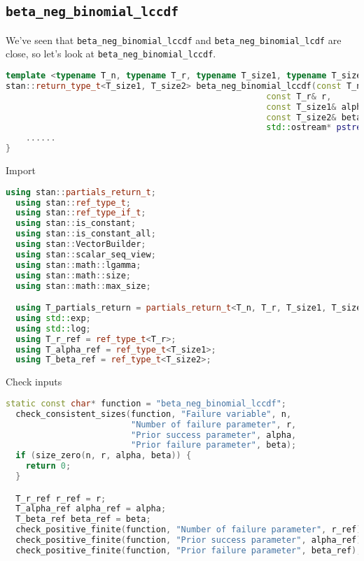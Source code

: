 \documentclass[11pt]{article}
\begin{document}
\cprotect\subsection{\verb|beta_neg_binomial_lccdf|}

We've seen that \verb|beta_neg_binomial_lccdf| and \verb|beta_neg_binomial_lcdf| are close, so let's look at \verb|beta_neg_binomial_lccdf|.

\begin{lstlisting}[language=c++, style=lgeneral]
template <typename T_n, typename T_r, typename T_size1, typename T_size2>
stan::return_type_t<T_size1, T_size2> beta_neg_binomial_lccdf(const T_n& n, 
                                                    const T_r& r,
                                                    const T_size1& alpha,
                                                    const T_size2& beta,
                                                    std::ostream* pstream__) {
	......
}
\end{lstlisting}

Import
\begin{lstlisting}[language=c++, style=lgeneral]
  using stan::partials_return_t;
  using stan::ref_type_t;
  using stan::ref_type_if_t;
  using stan::is_constant;
  using stan::is_constant_all;
  using stan::VectorBuilder;
  using stan::scalar_seq_view;
  using stan::math::lgamma;
  using stan::math::size;
  using stan::math::max_size;

  using T_partials_return = partials_return_t<T_n, T_r, T_size1, T_size2>;
  using std::exp;
  using std::log;
  using T_r_ref = ref_type_t<T_r>;
  using T_alpha_ref = ref_type_t<T_size1>;
  using T_beta_ref = ref_type_t<T_size2>;
\end{lstlisting}

Check inputs
\begin{lstlisting}[language=c++, style=lgeneral]
  static const char* function = "beta_neg_binomial_lccdf";
  check_consistent_sizes(function, "Failure variable", n,
                         "Number of failure parameter", r,
                         "Prior success parameter", alpha,
                         "Prior failure parameter", beta);
  if (size_zero(n, r, alpha, beta)) {
    return 0;
  }

  T_r_ref r_ref = r;
  T_alpha_ref alpha_ref = alpha;
  T_beta_ref beta_ref = beta;
  check_positive_finite(function, "Number of failure parameter", r_ref);
  check_positive_finite(function, "Prior success parameter", alpha_ref);
  check_positive_finite(function, "Prior failure parameter", beta_ref);
\end{lstlisting}
\end{document}
